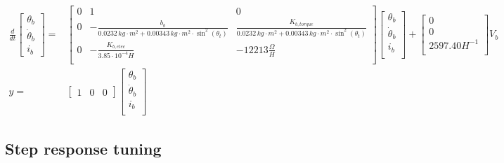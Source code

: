 \documentclass[../../main]{subfiles}
\begin{document}
\begin{equation}
      \label{eq:Theoretical_models_bottom}
      \begin{split}
      \frac{d}{dt}
          \begin{bmatrix}
              \theta_b        \\
              \dot \theta_b   \\
              i_b
          \end{bmatrix}
        =&
          \begin{bmatrix}
              0 & 1                         & 0                         \\
              0 & -\frac{b_b}{0.0232\si{\,kg\cdot m^2} + 0.00343 \si{\,kg\cdot m^2}\cdot \sin^2(\theta_t)} & \frac{K_{b,torque}}{0.0232\si{\,kg\cdot m^2} + 0.00343 \si{\,kg\cdot m^2}\cdot \sin^2(\theta_t)}  \\
              0 & -\frac{K_{b,elec}}{3.85\cdot 10^{-4}\si{H}}   & -12213 \si{\frac{\Omega}{H}}          \\
          \end{bmatrix}
    \begin{bmatrix}
        \theta_b        \\
        \dot \theta_b   \\
        i_b             \\
    \end{bmatrix}
        +
    \begin{bmatrix}
        0             \\
        0             \\
        2597.40 \si{H^{-1}} \\
    \end{bmatrix}
    V_b
\\
      y =&
    \begin{bmatrix}
        1 & 0 & 0
    \end{bmatrix}
    \begin{bmatrix}
        \theta_b \\
        \dot \theta_b\\
        i_b\\
    \end{bmatrix}
  \end{split}
\end{equation}
\subsection{Step response tuning}
\label{ch:stepresponse_tuning}

\end{document}
